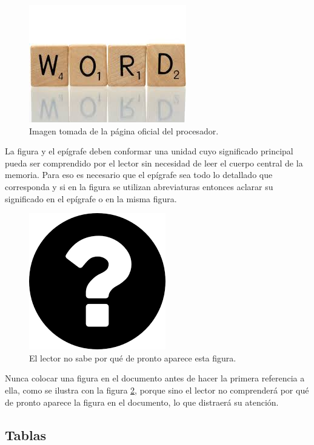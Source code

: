 \begin{figure}[h!]
	\centering
	\includegraphics[scale=.25]{./Figures/word.jpeg}
	\caption{Imagen tomada de la página oficial del procesador\protect\footnotemark.}
	\label{fig:palabraIngles}
\end{figure}



La figura y el epígrafe deben conformar una unidad cuyo significado principal pueda ser comprendido por el lector sin necesidad de leer el cuerpo central de la memoria. Para eso es necesario que el epígrafe sea todo lo detallado que corresponda y si en la figura se utilizan abreviaturas entonces aclarar su significado en el epígrafe o en la misma figura.

\begin{figure}[h]
	\centering
	\includegraphics[scale=.4]{./Figures/questionMark.png}
	\caption{El lector no sabe por qué de pronto aparece esta figura.}
	\label{fig:questionMark}
\end{figure}

Nunca colocar una figura en el documento antes de hacer la primera referencia a ella, como se ilustra con la figura \ref{fig:questionMark}, porque sino el lector no comprenderá por qué de pronto aparece la figura en el documento, lo que distraerá su atención.

\subsection{Tablas}

